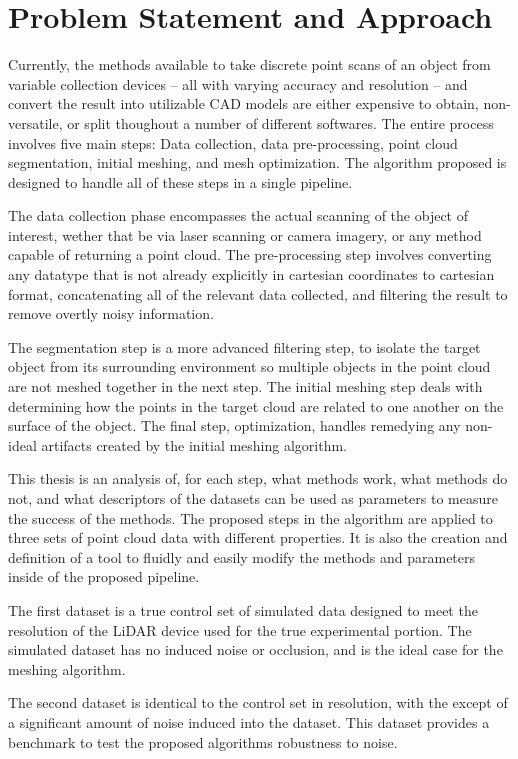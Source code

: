 \documentclass[12pt]{drexelthesis}
\let\Oldsection\section
\renewcommand{\section}{\FloatBarrier\Oldsection}
\begin{document}
\section{Problem Statement and Approach}
Currently, the methods available to take discrete point scans of an object from variable collection devices -- all with varying accuracy and resolution -- and convert the result into utilizable CAD models are either expensive to obtain, non-versatile, or split thoughout a number of different softwares. The entire process involves five main steps: Data collection, data pre-processing, point cloud segmentation, initial meshing, and mesh optimization. The algorithm proposed is designed to handle all of these steps in a single pipeline.

The data collection phase encompasses the actual scanning of the object of interest, wether that be via laser scanning or camera imagery, or any method capable of returning a point cloud. The pre-processing step involves converting any datatype that is not already explicitly in cartesian coordinates to cartesian format, concatenating all of the relevant data collected, and filtering the result to remove overtly noisy information.

The segmentation step is a more advanced filtering step, to isolate the target object from its surrounding environment so multiple objects in the point cloud are not meshed together in the next step. The initial meshing step deals with determining how the points in the target cloud are related to one another on the surface of the object. The final step, optimization, handles remedying any non-ideal artifacts created by the initial meshing algorithm.

This thesis is an analysis of, for each step, what methods work, what methods do not, and what descriptors of the datasets can be used as parameters to measure the success of the methods. The proposed steps in the algorithm are applied to three sets of point cloud data with different properties. It is also the creation and definition of a tool to fluidly and easily modify the methods and parameters inside of the proposed pipeline.

The first dataset is a true control set of simulated data designed to meet the resolution of the LiDAR device used for the true experimental portion. The simulated dataset has no induced noise or occlusion, and is the ideal case for the meshing algorithm.

The second dataset is identical to the control set in resolution, with the except of a significant amount of noise induced into the dataset. This dataset provides a benchmark to test the proposed algorithms robustness to noise.
\end{document}
